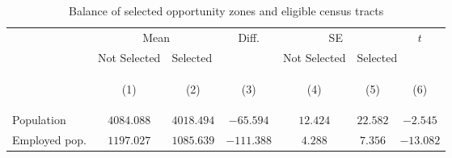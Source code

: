
        \begin{table}[tbh]
        \caption{Balance of selected opportunity zones and eligible census tracts}
        \label{tab:balance_of_selected_opportunity_zones_and_eligible_census_tracts}
        \scriptsize
        \centering
        \vspace{1em}
        \begin{threeparttable}
        \begin{tabular}{lcccccc}
\toprule
{} & \multicolumn{2}{c}{Mean} &                                                                                       Diff. & \multicolumn{2}{c}{SE} &                                                                                         $t$ \\
{} &                                                                                Not Selected & \multicolumn{2}{l}{Selected} &                                                                                Not Selected & \multicolumn{2}{l}{Selected} \\
{} & \hypertarget{tabcol:balance_of_selected_opportunity_zones_and_eligible_census_tracts1}{(1)} & \hypertarget{tabcol:balance_of_selected_opportunity_zones_and_eligible_census_tracts2}{(2)} & \hypertarget{tabcol:balance_of_selected_opportunity_zones_and_eligible_census_tracts3}{(3)} & \hypertarget{tabcol:balance_of_selected_opportunity_zones_and_eligible_census_tracts4}{(4)} & \hypertarget{tabcol:balance_of_selected_opportunity_zones_and_eligible_census_tracts5}{(5)} & \hypertarget{tabcol:balance_of_selected_opportunity_zones_and_eligible_census_tracts6}{(6)} \\
\midrule
Population              &                                                                                  $4084.088$ &                                                                                  $4018.494$ &                                                                                   $-65.594$ &                                                                                    $12.424$ &                                                                                    $22.582$ &                                                                                    $-2.545$ \\
Employed pop.           &                                                                                  $1197.027$ &                                                                                  $1085.639$ &                                                                                  $-111.388$ &                                                                                     $4.288$ &                                                                                     $7.356$ &                                                                                   $-13.082$ \\

\end{tabular}
\end{threeparttable}
\end{table}
